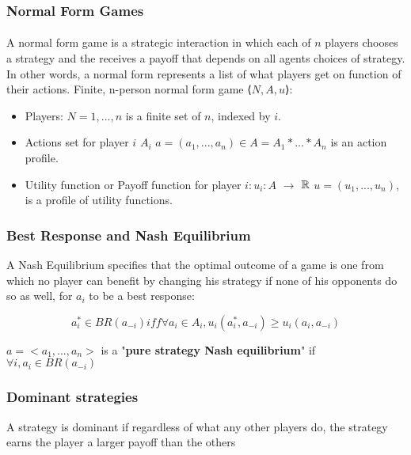 \subsubsection{Normal Form Games}
\paragraph{}A normal form game is a strategic interaction in which each of $n$ players chooses a strategy and the receives a payoff that depends on all agents choices of strategy. In other words, a normal form represents a list of what players get on function of their actions.
Finite, n-person normal form game  ⟨$N, A, u$⟩:
\begin{itemize}
\item Players: $ N = {1, ... , n} $ is a finite set of $n$, indexed by $i$.
\item Actions set for player $i$ $A_i$
\subitem $a = (a_1,...,a_n) \in A = A_1 * ... * A_n $ is an action profile.
\item Utility function or Payoff function for player $i: u_i : A $  $\to$ ${\Bbb{R}}$
\subitem $u = (u_1,..., u_n)$, is a profile of utility functions.
\end{itemize}

\subsubsection{Best Response and Nash Equilibrium}\label{subsection}
A Nash Equilibrium specifies that the optimal outcome of a game is one from which no player can benefit by changing his strategy if none of his opponents do so as well,
for $a_i$ to be a best response:
\begin{mydef}\label{def:def1500}
\begin{equation}\label{eq:1666}
 a_i^* \in BR(a_{-i})  iff   \forall a_i \in A_i, u_i(a_i^*,a_{-i}) \geq u_i(a_i, a_{-i})
\end{equation}
\end{mydef}
\begin{mydef}\label{def:def1500}

$a = <a_1,...,a_n>$ is a "\textbf{pure strategy Nash equilibrium}" if $\forall i, a_i \in BR(a_{-i})$
\end{mydef}

\subsubsection{Dominant strategies}
A strategy is dominant if regardless of what any other players do, the strategy earns the player a larger payoff than the others
